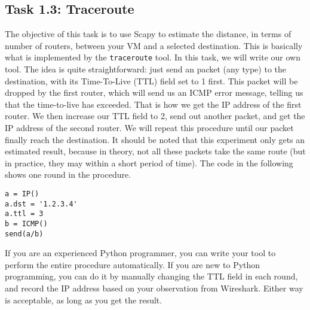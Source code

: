 \subsection{Task 1.3: Traceroute} 

The objective of this task is to use Scapy to estimate the distance, in
terms of number of routers, between your VM and a selected destination.  
This is basically what is implemented by the \texttt{traceroute} tool. 
In this task, we will write our own tool. The idea is quite
straightforward: just send an packet (any type) to the destination, with
its Time-To-Live (TTL) field set to 1 first. This packet will be dropped by
the first router, which will send us an ICMP error message, telling us 
that the time-to-live has exceeded. That is how we get the IP address of
the first router. We then increase our TTL field to 2, send out another
packet, and get the IP address of the second router. We will repeat this
procedure until our packet finally reach the destination. It should be
noted that this experiment only gets an estimated result, because in
theory, not all these packets take the same route (but in practice, they may
within a short period of time). The code in the following shows one round 
in the procedure. 


\begin{lstlisting}
a = IP()
a.dst = '1.2.3.4'
a.ttl = 3
b = ICMP()
send(a/b)
\end{lstlisting}


If you are an experienced Python programmer, you can write your tool 
to perform the entire procedure automatically. If you are new to Python
programming, you can do it by manually changing the TTL field in 
each round, and record the IP address based on your observation 
from Wireshark. Either way is acceptable, as long as you get the result. 


